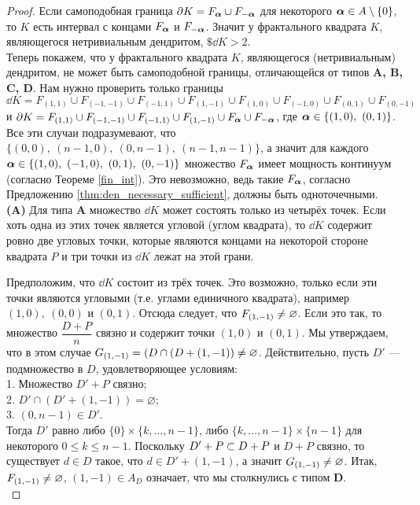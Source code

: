 \begin{proof}
Если самоподобная граница $\partial K=F_{\bm{\alpha}}\cup F_{-{\bm{\alpha}}}$ для некоторого ${\bm{\alpha}}\in A\setminus\{0\}$, то $K$  есть интервал с концами $F_{\bm{\alpha}}$ и $ F_{-{\bm{\alpha}}}$.
Значит у фрактального квадрата $K$, являющегося нетривиальным дендритом, $\$\dd K>2$.\\

Теперь покажем, что у фрактального квадрата $K$, являющегося (нетривиальным) дендритом, не может быть самоподобной границы, отличающейся от типов {\bf A, B, C, D}.
Нам нужно проверить только границы $\dd K=F_{(1,1)}\cup F_{(-1,-1)}\cup F_{(-1,1)}\cup F_{(1,-1)}\cup F_{(1,0)}\cup F_{(-1,0)}\cup F_{(0,1)}\cup F_{(0,-1)}$ и $\partial K=F_{(1,1)}\cup F_{(-1,-1)}\cup F_{(-1,1)}\cup F_{(1,-1)}\cup F_{\bm{\alpha}}\cup F_{-{\bm{\alpha}}}$, где ${\bm{\alpha}}\in\{(1,0),\ (0,1)\}$.
Все эти случаи подразумевают, что $\{(0,0),\ (n-1,0),\ (0,n-1),\ (n-1,n-1)\}$, а значит для каждого $\bma\in\{(1,0),\ (-1,0),\ (0,1),\ (0,-1)\}$ множество $F_{\bm{\alpha}}$ имеет мощность континуум (согласно Теореме \ref{fin_int}).
Это невозможно, ведь такие $F_{\bm{\alpha}}$, согласно Предложению \ref{thm:den_necessary_sufficient}, должны быть одноточечными.\\


{\bf (A)} Для типа {\bf A} множество $\dd K$ может состоять только из четырёх точек. 
Если хоть одна из этих точек является угловой (углом квадрата), то $\dd K$ содержит ровно две угловых точки, которые являются концами на некоторой стороне квадрата $P$ и три точки из $\dd K$ лежат на этой грани.

Предположим, что $\dd K$ состоит из трёх точек.
Это возможно, только если эти точки являются угловыми (т.е. углами единичного квадрата), например $(1,0),\ (0,0)$ и $(0,1)$.
Отсюда следует, что $F_{(1,-1)}\neq\varnothing$.
Если это так, то множество $\dfrac{D+P}{n}$ связно и содержит точки $(1,0)$ и $(0,1)$. 
Мы утверждаем, что в этом случае $G_{(1,-1)}=(D\cap (D+(1,-1))\neq\varnothing$.
Действительно, пусть $D'$ --- подмножество в $D$, удовлетворяющее условиям:\\
1. Множество $D'+P$ связно;\\
2. $D'\cap (D'+(1,-1))=\varnothing$;\\
3. $(0,n-1)\in D'$. \\
Тогда $D'$ равно либо $\{0\}\times\{k,\ldots,n-1\}$, либо $\{k,\ldots,n-1\}\times\{n-1\}$ для некоторого $0\leq k\leq n-1$.
Поскольку $D'+P\subset D+P$ и $D+P$ связно, то существует $d\in D$ такое, что $d\in D'+(1,-1)$, а значит $G_{(1,-1)}\neq\varnothing$.
Итак, $F_{(1,-1)}\neq\varnothing$, $(1,-1)\in A_D$ означает, что мы столкнулись с типом {\bf D}. \\


\end{proof}

